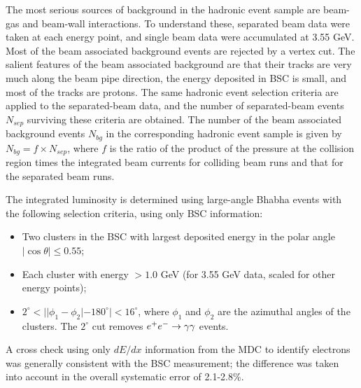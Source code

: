 The most serious sources of background in the hadronic event
sample are beam-gas and beam-wall interactions.
To understand these,
separated beam data
were taken at each energy point, and single beam data were accumulated at
3.55 GeV.  Most of the beam
associated background events are rejected by a vertex cut.  The
salient features of the beam associated background are that their
tracks are very much along the beam pipe direction, the energy
deposited in BSC is small, and most of the tracks are protons.  The
same hadronic event selection criteria are applied to the
separated-beam data, and the number of separated-beam events $N_{sep}$
surviving these criteria are obtained.  The number of the beam
associated background events $N_{bg}$ in the corresponding hadronic
event sample is given by $N_{bg}=f \times N_{sep}$, where $f$ is
the ratio of the product of the pressure at the
collision region times the integrated beam currents for colliding beam
runs and that for the separated beam runs.


The integrated luminosity is determined using large-angle Bhabha events
with the following selection criteria, using only BSC information:

\begin{itemize}
\item Two clusters in the BSC with largest deposited energy in the
      polar angle $|\cos \theta| \le 0.55$;
\item Each cluster with energy $> 1.0$ GeV (for 3.55 GeV data, scaled
      for other energy points);
\item $2^{\circ} < | |\phi_{1} - \phi_{2}| - 180^{\circ} | < 16^{\circ}$,
      where $\phi_{1}$ and $\phi_{2}$ are the azimuthal angles of the
      clusters. The $2^{\circ}$ cut removes $e^+ e^- \rightarrow \gamma
      \gamma$ events.

\end{itemize}
A cross check using only $dE/dx$ information from the MDC
to identify electrons was generally
consistent with the BSC measurement; the difference was taken into
account in the overall systematic error of 2.1-2.8\%.




